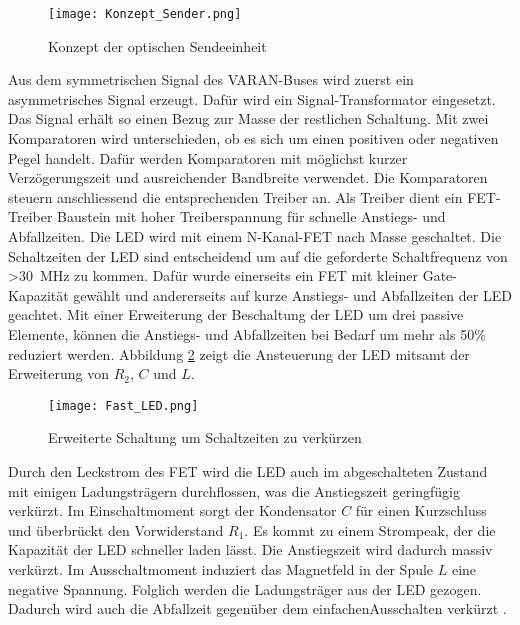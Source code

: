 \begin{figure}[H]
	\centering
	\texttt{[image: Konzept\_Sender.png]}
	\caption{Konzept der optischen Sendeeinheit}\label{fig:Konzept_Sender}
\end{figure}

Aus dem symmetrischen Signal des VARAN-Buses wird zuerst ein asymmetrisches Signal erzeugt. Dafür wird ein Signal-Transformator eingesetzt. Das Signal erhält so einen Bezug zur Masse der restlichen Schaltung. Mit zwei Komparatoren wird unterschieden, ob es sich um einen positiven oder negativen Pegel handelt. Dafür werden Komparatoren mit möglichst kurzer Verzögerungszeit und ausreichender Bandbreite verwendet. Die Komparatoren steuern anschliessend die entsprechenden Treiber an. 
\newline
Als Treiber dient ein FET-Treiber Baustein mit hoher Treiberspannung für schnelle Anstiegs- und Abfallzeiten. Die LED wird mit einem N-Kanal-FET nach Masse geschaltet. Die Schaltzeiten der LED sind entscheidend um auf die geforderte Schaltfrequenz von \textgreater \SI{30}{MHz} zu kommen. Dafür wurde einerseits ein FET mit kleiner Gate-Kapazität gewählt und andererseits auf kurze Anstiegs- und Abfallzeiten der LED geachtet.
\newline
Mit einer Erweiterung der Beschaltung der LED um drei passive Elemente, können die Anstiegs- und Abfallzeiten bei Bedarf um mehr als 50\% reduziert werden. Abbildung \ref{fig:Fast_LED} zeigt die Ansteuerung der LED mitsamt der Erweiterung von $R_{2}$, $C$ und $L$.

 \begin{figure}[h]
 	\centering
 	\texttt{[image: Fast\_LED.png]}
 	\caption{Erweiterte Schaltung um Schaltzeiten zu verkürzen}\label{fig:Fast_LED}
 \end{figure}

Durch den Leckstrom des FET wird die LED auch im abgeschalteten Zustand mit einigen Ladungsträgern durchflossen, was die Anstiegszeit geringfügig verkürzt. Im Einschaltmoment sorgt der Kondensator $C$ für einen Kurzschluss und überbrückt den Vorwiderstand $R_{1}$. Es kommt zu einem Strompeak, der die Kapazität der LED schneller laden lässt. Die Anstiegszeit wird dadurch massiv verkürzt. Im Ausschaltmoment induziert das Magnetfeld in der Spule $L$ eine negative Spannung. Folglich werden die Ladungsträger aus der LED gezogen. Dadurch wird auch die Abfallzeit gegenüber dem \glqq einfachen\grqq Ausschalten verkürzt \cite{high-speed-led}.

\newpage
